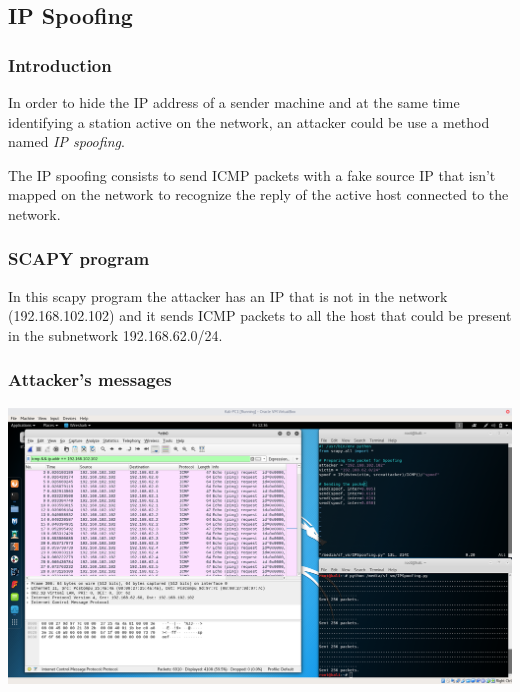 \subsection{IP Spoofing}
\subsubsection{Introduction}
In order to hide the IP address of a sender machine and at the same time identifying a station active on the network, an attacker could be use a method named \textit{IP spoofing}.\par
The IP spoofing consists to send ICMP packets with a fake source IP that isn't mapped on the network to recognize the reply of the active host connected to the network.\par

\subsubsection{SCAPY program}
In this scapy program the attacker has an IP that is not in the network (192.168.102.102) and it sends ICMP packets to all the host that could be present in the subnetwork 192.168.62.0/24.\par


\subsubsection{Attacker's messages}
\includegraphics[width=16cm]{img/IPSpoofingICMP.png}

